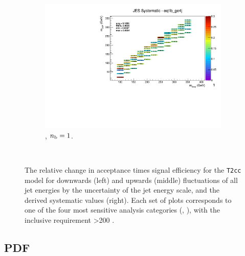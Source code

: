 \begin{figure}[ht!]
\begin{subfigure}[b]{0.32\textwidth}
    \includegraphics[width=\textwidth, page=1]{Figs/sms/t2cc/v37/systs/T2cc_JES_eq1b_ge4j.pdf}
    \caption{\njhigh, $n_{\text{b}} = 1$.}
    \label{fig:sms-jes-t2cc-ge4j-1b}
  \end{subfigure}\\
  \caption{The relative change in acceptance times signal efficiency for the
  \texttt{T2cc} model for downwards (left) and upwards (middle) fluctuations
  of all jet energies by the uncertainty of the jet energy scale, and the 
  derived systematic values (right). Each set of plots corresponds to one of
  the four most sensitive analysis categories (\nb, \nj), with the inclusive 
  requirement \HT>200 \gev.}
  \label{fig:sms-jes-t2cc}
\end{figure}


\newpage
\subsection*{PDF}
\label{sec:t2cc_pdf_plots}

